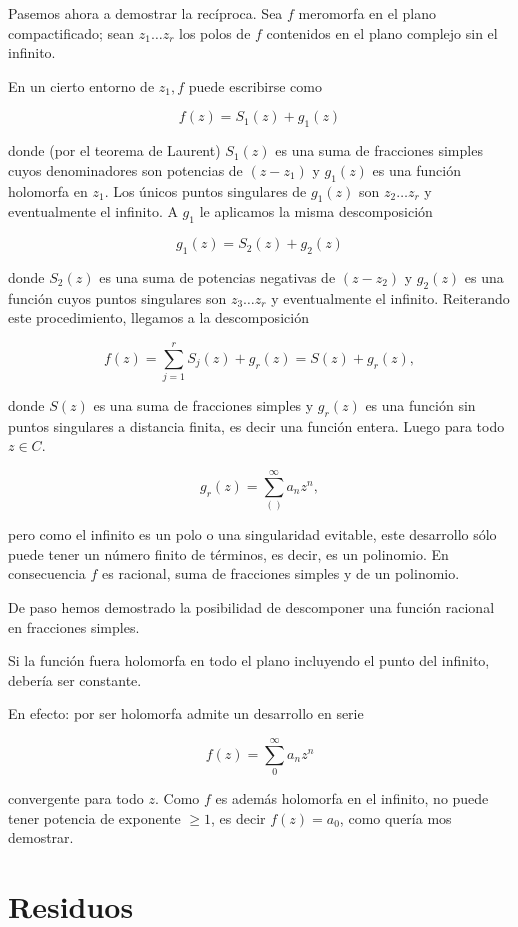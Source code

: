 \documentclass[10pt]{article}
\theoremstyle{plain}
\theoremstyle{definition}
\theoremstyle{remark}
\begin{document}
Pasemos ahora a demostrar la recíproca. Sea $f$ meromorfa en el plano compactificado; sean $z_{1} \ldots z_{r}$ los polos de $f$ contenidos en el plano complejo sin el infinito.

En un cierto entorno de $z_{1}, f$ puede escribirse como

$$
f(z)=S_{1}(z)+g_{1}(z)
$$

donde (por el teorema de Laurent) $S_{1}(z)$ es una suma de fracciones simples cuyos denominadores son potencias de $\left(z-z_{1}\right)$ y $g_{1}(z)$ es una función holomorfa en $z_{1}$. Los únicos puntos singulares de $g_{1}(z)$ son $z_{2} \ldots z_{r}$ y eventualmente el infinito. A $g_{1}$ le aplicamos la misma descomposición

$$
g_{1}(z)=S_{2}(z)+g_{2}(z)
$$

donde $S_{2}(z)$ es una suma de potencias negativas de $\left(z-z_{2}\right)$ y $g_{2}(z)$ es una función cuyos puntos singulares son $z_{3} \ldots z_{r}$ y eventualmente el infinito. Reiterando este procedimiento, llegamos a la descomposición

$$
f(z)=\sum_{j=1}^{r} S_{j}(z)+g_{r}(z)=S(z)+g_{r}(z),
$$

donde $S(z)$ es una suma de fracciones simples y $g_{r}(z)$ es una función sin puntos singulares a distancia finita, es decir una función entera. Luego para todo $z \in C$.

$$
g_{r}(z)=\sum_{()}^{\infty} a_{n} z^{n},
$$

pero como el infinito es un polo o una singularidad evitable, este desarrollo sólo puede tener un número finito de términos, es decir, es un polinomio. En consecuencia $f$ es racional, suma de fracciones simples y de un polinomio.

De paso hemos demostrado la posibilidad de descomponer una función racional en fracciones simples.

Si la función fuera holomorfa en todo el plano incluyendo el punto del infinito, debería ser constante.

En efecto: por ser holomorfa admite un desarrollo en serie

$$
f(z)=\sum_{0}^{\infty} a_{n} z^{n}
$$

convergente para todo $z$. Como $f$ es además holomorfa en el infinito, no puede tener potencia de exponente $\geqslant 1$, es decir $f(z)=a_{0}$, como quería mos demostrar.

\section{Residuos}
\end{document}
